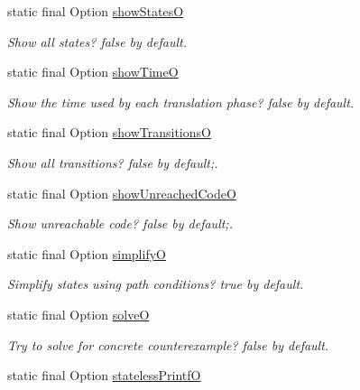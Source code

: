 \begin{DoxyCompactItemize}
static final Option \hyperlink{classedu_1_1udel_1_1cis_1_1vsl_1_1civl_1_1config_1_1IF_1_1CIVLConstants_a4de1a46f393deba38173ced23addf465}{show\+States\+O}
\begin{DoxyCompactList}\small\item\em Show all states? false by default. \end{DoxyCompactList}\item 
static final Option \hyperlink{classedu_1_1udel_1_1cis_1_1vsl_1_1civl_1_1config_1_1IF_1_1CIVLConstants_a72c9697b7ccfd46796d824ca05113a28}{show\+Time\+O}
\begin{DoxyCompactList}\small\item\em Show the time used by each translation phase? false by default. \end{DoxyCompactList}\item 
static final Option \hyperlink{classedu_1_1udel_1_1cis_1_1vsl_1_1civl_1_1config_1_1IF_1_1CIVLConstants_a5da0f4d2c2f981f3ca766f52e3229940}{show\+Transitions\+O}
\begin{DoxyCompactList}\small\item\em Show all transitions? false by default;. \end{DoxyCompactList}\item 
static final Option \hyperlink{classedu_1_1udel_1_1cis_1_1vsl_1_1civl_1_1config_1_1IF_1_1CIVLConstants_accc88c5762fd5a991a929d99811577a0}{show\+Unreached\+Code\+O}
\begin{DoxyCompactList}\small\item\em Show unreachable code? false by default;. \end{DoxyCompactList}\item 
static final Option \hyperlink{classedu_1_1udel_1_1cis_1_1vsl_1_1civl_1_1config_1_1IF_1_1CIVLConstants_ad5ee73715de9137c565ef532bf4f88fa}{simplify\+O}
\begin{DoxyCompactList}\small\item\em Simplify states using path conditions? true by default. \end{DoxyCompactList}\item 
static final Option \hyperlink{classedu_1_1udel_1_1cis_1_1vsl_1_1civl_1_1config_1_1IF_1_1CIVLConstants_aca085e9bab6d01460182843a9cfb180b}{solve\+O}
\begin{DoxyCompactList}\small\item\em Try to solve for concrete counterexample? false by default. \end{DoxyCompactList}\item 
static final Option \hyperlink{classedu_1_1udel_1_1cis_1_1vsl_1_1civl_1_1config_1_1IF_1_1CIVLConstants_a80dd816ccd1150a1b07315d0a029c165}{stateless\+Printf\+O}

\end{DoxyCompactItemize}
